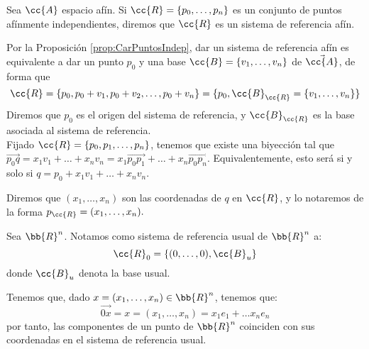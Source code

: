 \begin{definicion}
    Sea $\cc{A}$ espacio afín. Si $\cc{R}=\{p_0,\dots,p_n\}$ es un conjunto de puntos afínmente independientes, diremos que $\cc{R}$ es un sistema de referencia afín.
\end{definicion}

Por la Proposición \ref{prop:CarPuntosIndep}, dar un sistema de referencia afín es equivalente a dar un punto $p_0$ y una base $\cc{B}=\{v_1,\dots, v_n\}$ de $\vec{\cc{A}}$, de forma que $$\cc{R}=\{p_0,p_0+v_1, p_0+v_2, \dots, p_0+v_n\}=\{p_0, \cc{B}_{\cc{R}}=\{v_1,\dots, v_n\}\}$$
Diremos que $p_0$ es el origen del sistema de referencia, y $\cc{B}_{\cc{R}}$ es la base asociada al sistema de referencia.\\

Fijado $\cc{R}=\{p_0, p_1,\dots, p_n\}$, tenemos que existe una biyección
tal que $\vec{p_0q}=x_1v_1+\dots + x_nv_n=x_1\vec{p_0p_1} + \dots + x_n\vec{p_0p_n}$. Equivalentemente, esto será si y solo si $q=p_0+x_1v_1+\dots + x_nv_n$.

Diremos que $(x_1,\dots, x_n)$ son las coordenadas de $q$ en $\cc{R}$, y lo notaremos de la forma $p_{\cc{R}}=(x_1,\dots, x_n).$

\begin{definicion} Sea $\bb{R}^n$. Notamos como sistema de referencia usual de $\bb{R}^n$ a:
\begin{equation*}
    \cc{R}_0=\{(0,\dots, 0),\cc{B}_u\}
\end{equation*}
donde $\cc{B}_u$ denota la base usual.
\end{definicion}
Tenemos que, dado $x=(x_1,\dots,x_n)\in \bb{R}^n$, tenemos que:
\begin{equation*}
    \vec{0x} = x = (x_1,\dots,x_n) = x_1e_1+\dots x_ne_n
\end{equation*}
por tanto, las componentes de un punto de $\bb{R}^n$ coinciden con sus coordenadas en el sistema de referencia usual.

